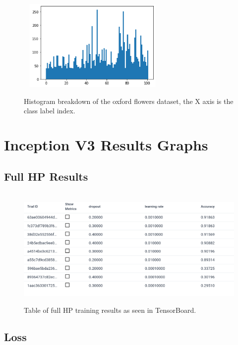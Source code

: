 \documentclass[12pt,a4paper]{report}
\begin{document}
\begin{figure}[h]\
    \centering
    \includegraphics[width=0.6\textwidth]{dataset_hist.png}
    \caption{Histogram breakdown of the oxford flowers dataset, the X axis is the class label index.}
    \label{fig:dataset_hist}
\end{figure}

\clearpage

\section{Inception V3 Results Graphs}

\subsection{Full HP Results}

\label{subsec:hp}

\begin{figure}[h]\
    \centering
    \includegraphics[width=\textwidth]{full_hp.png}
    \caption{Table of full HP training results as seen in TensorBoard.}
    \label{fig:hp_full}
\end{figure}

\subsection{Loss}

\label{subsec:loss}
\end{document}

